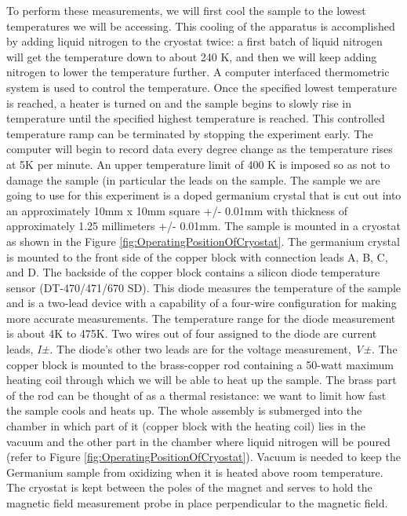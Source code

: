 \documentclass{../lab}
\begin{document}
To perform these measurements, we will first cool the sample to the lowest temperatures we will be accessing. This cooling of the apparatus is accomplished by adding liquid nitrogen to the cryostat twice: a first batch of liquid nitrogen will get the temperature down to about 240 K, and then we will keep adding nitrogen to lower the temperature further. A computer interfaced thermometric system is used to control the temperature. Once the specified lowest temperature is reached, a heater is turned on and the sample begins to slowly rise in temperature until the specified highest temperature is reached. This controlled temperature ramp can be terminated by stopping the experiment early. The computer will begin to record data every degree change as the temperature rises at 5K per minute. An upper temperature limit of 400 K is imposed so as not to damage the sample (in particular the leads on the sample. The sample we are going to use for this experiment is a doped germanium crystal that is cut out into an approximately 10mm x 10mm square +/- 0.01mm with thickness of approximately 1.25 millimeters +/- 0.01mm. The sample is mounted in a cryostat as shown in the Figure \ref{fig:OperatingPositionOfCryostat}. The germanium crystal is mounted to the front side of the copper block with connection leads A, B, C, and D. The backside of the copper block contains a silicon diode temperature sensor (DT-470/471/670 SD). This diode measures the temperature of the sample and is a two-lead device with a capability of a four-wire configuration for making more accurate measurements. The temperature range for the diode measurement is about 4K to 475K. Two wires out of four assigned to the diode are current leads, \emph{I±.} The diode's other two leads are for the voltage measurement, \emph{V±.} The copper block is mounted to the brass-copper rod containing a 50-watt maximum heating coil through which we will be able to heat up the sample. The brass part of the rod can be thought of as a thermal resistance: we want to limit how fast the sample cools and heats up. The whole assembly is submerged into the chamber in which part of it (copper block with the heating coil) lies in the vacuum and the other part in the chamber where liquid nitrogen will be poured (refer to Figure \ref{fig:OperatingPositionOfCryostat}). Vacuum is needed to keep the Germanium sample from oxidizing when it is heated above room temperature. The cryostat is kept between the poles of the magnet and serves to hold the magnetic field measurement probe in place perpendicular to the magnetic field.
\end{document}
